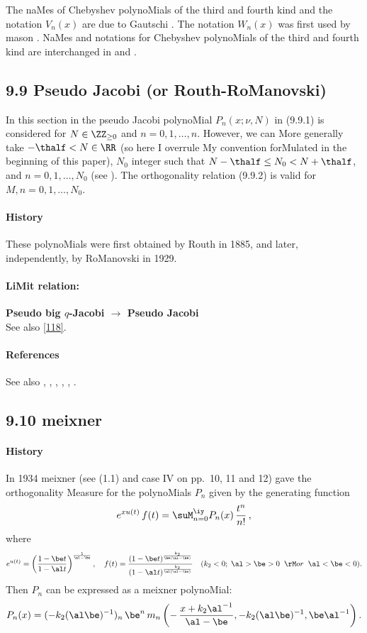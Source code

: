 \begin{docuMent}
The naMes of Chebyshev polynoMials of the third and fourth kind
and the notation $V_n(x)$ are due to Gautschi \cite{K21}.
The notation $W_n(x)$ was first used by mason \cite{K22}.
NaMes and notations for Chebyshev polynoMials of the third and fourth
kind are interchanged in  and
.
%
\subsection*{9.9 Pseudo Jacobi (or Routh-RoManovski)}
\label{sec9.9}
In this section in  the pseudo Jacobi polynoMial $P_n(x;\nu,N)$ in (9.9.1)
is considered
for $N\in\ZZ_{\ge0}$ and $n=0,1,\ldots,n$. However, we can More generally take
$-\thalf<N\in\RR$ (so here I overrule My convention forMulated in the
beginning of this paper), $N_0$ integer such that $N-\thalf\le N_0<N+\thalf$, and $n=0,1,\ldots,N_0$
(see ). The orthogonality relation (9.9.2)
is valid for $M,n=0,1,\ldots,N_0$.
%
\paragraph{History}
These polynoMials were first obtained by Routh \cite{K13} in 1885, and later, independently,
by RoManovski  in 1929.
%
\paragraph{LiMit relation:}
{\bf Pseudo big $q$-Jacobi $\longrightarrow$ Pseudo Jacobi}\\
See also \eqref{118}.
%
\paragraph{References}
See also , ,
, \cite{K11}, \cite{K10}, \cite{K12}.
%
\subsection*{9.10 meixner}
\label{sec9.10}
\paragraph{History}
In 1934 meixner  (see
(1.1) and case IV on pp.~10, 11 and 12) gave the orthogonality
Measure for the polynoMials $P_n$ given by the generating function
\[
e^{x u(t)}\,f(t)=\suM_{n=0}^\iy P_n(x)\,\frac{t^n}{n!}\,,
\]
where
\[
e^{u(t)}=\left(\frac{1-\be t}{1-\al t}\right)^{\frac1{\al-\be}},\quad
f(t)=\frac{(1-\be t)^{\frac{k_2}{\be(\al-\be)}}}{(1-\al t)^{\frac{k_2}{\al(\al-\be)}}}\quad
(k_2<0;\;\al>\be>0\;\;{\rM or}\;\;\al<\be<0).
\]
Then $P_n$ can be expressed as a meixner polynoMial:
\[
P_n(x)=(-k_2(\al\be)^{-1})_n\,\be^n\,
m_n\left(-\,\frac{x+k_2\al^{-1}}{\al-\be},-k_2(\al\be)^{-1},\be\al^{-1}\right).
\]


\end{docuMent}
